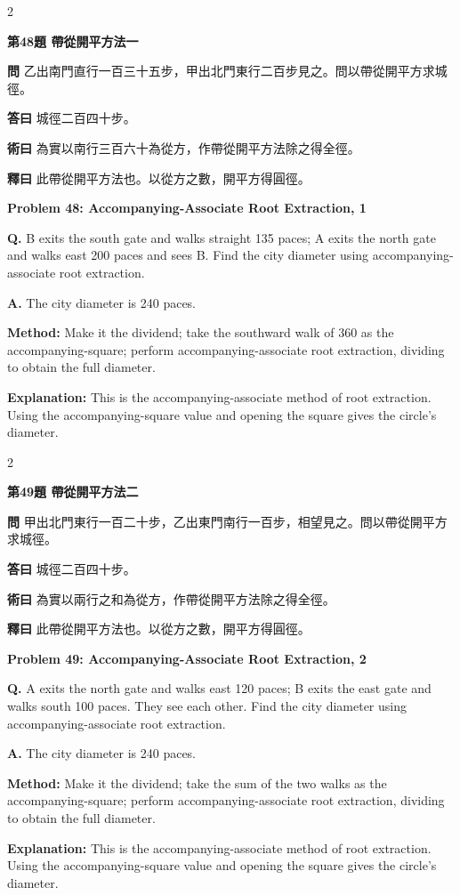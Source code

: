 \documentclass[11pt,a4paper]{article}
\newcommand{\wen}[1]{\noindent\textbf{問} #1\par\smallskip}
\newcommand{\da}[1]{\noindent\textbf{答曰} #1\par\smallskip}
\newcommand{\shu}[1]{\noindent\textbf{術曰} #1\par\smallskip}
\newcommand{\shi}[1]{\noindent\textbf{釋曰} #1\par\smallskip}
\newcommand{\wenE}[1]{\noindent\textbf{Q.} #1\par\smallskip}
\newcommand{\daE}[1]{\noindent\textbf{A.} #1\par\smallskip}
\newcommand{\shuE}[1]{\noindent\textbf{Method:} #1\par\smallskip}
\newcommand{\shiE}[1]{\noindent\textbf{Explanation:} #1\par\smallskip}
\begin{document}
\bigskip

\begin{paracol}{2}

\noindent\textbf{第48題 帶從開平方法一}

\wen{乙出南門直行一百三十五步，甲出北門東行二百步見之。問以帶從開平方求城徑。}
\da{城徑二百四十步。}
\shu{為實以南行三百六十為從方，作帶從開平方法除之得全徑。}
\shi{此帶從開平方法也。以從方之數，開平方得圓徑。}

\switchcolumn

\noindent\textbf{Problem 48: Accompanying-Associate Root Extraction, 1}

\wenE{B exits the south gate and walks straight 135 paces; A exits the north gate and walks east 200 paces and sees B. Find the city diameter using accompanying-associate root extraction.}
\daE{The city diameter is 240 paces.}
\shuE{Make it the dividend; take the southward walk of 360 as the accompanying-square; perform accompanying-associate root extraction, dividing to obtain the full diameter.}
\shiE{This is the accompanying-associate method of root extraction. Using the accompanying-square value and opening the square gives the circle's diameter.}

\end{paracol}

\bigskip

\begin{paracol}{2}

\noindent\textbf{第49題 帶從開平方法二}

\wen{甲出北門東行一百二十步，乙出東門南行一百步，相望見之。問以帶從開平方求城徑。}
\da{城徑二百四十步。}
\shu{為實以兩行之和為從方，作帶從開平方法除之得全徑。}
\shi{此帶從開平方法也。以從方之數，開平方得圓徑。}

\switchcolumn

\noindent\textbf{Problem 49: Accompanying-Associate Root Extraction, 2}

\wenE{A exits the north gate and walks east 120 paces; B exits the east gate and walks south 100 paces. They see each other. Find the city diameter using accompanying-associate root extraction.}
\daE{The city diameter is 240 paces.}
\shuE{Make it the dividend; take the sum of the two walks as the accompanying-square; perform accompanying-associate root extraction, dividing to obtain the full diameter.}
\shiE{This is the accompanying-associate method of root extraction. Using the accompanying-square value and opening the square gives the circle's diameter.}

\end{paracol}
\end{document}
